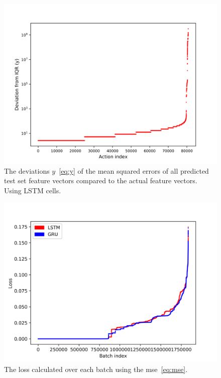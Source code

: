 \begin{figure}
	\begin{center}
		\includegraphics[scale=0.1]{experiments/cell/deviations/lstm}
	\end{center}
	\caption{The deviations \(y\)~\ref{eq:y} of the mean squared errors of all predicted test set feature vectors compared to the actual feature vectors. Using LSTM cells.~\label{fig:lstm_deviations}}
\end{figure}

\begin{figure}
	\begin{center}
		\includegraphics[scale=0.1]{experiments/cell/losses/comparison}
	\end{center}
	\caption{The loss calculated over each batch using the mse~\ref{eq:mse}.~\label{fig:gru_rnn_losses}}
\end{figure}

